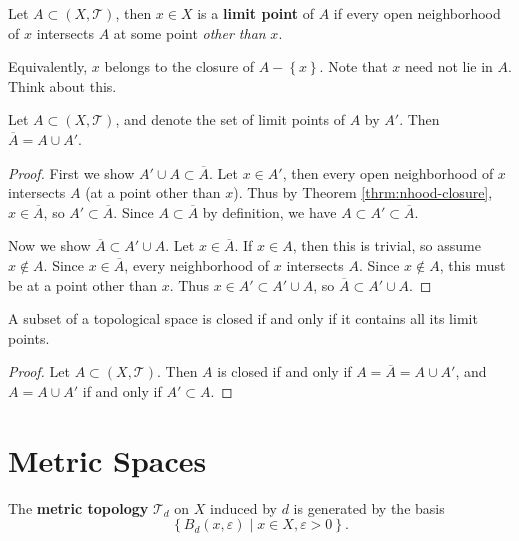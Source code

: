 \documentclass[10pt]{report}
\begin{document}
\begin{defn}
Let $A \subset (X,\mathcal{T})$, then $x \in X$ is a \textbf{limit point} of $A$ if every open neighborhood of $x$ intersects $A$ at some point \textit{other than} $x$.

	Equivalently, $x$ belongs to the closure of $A - \left\{ x \right\}$. Note that $x$ need not lie in $A$. {\color{red}Think about this.}
\end{defn}

\begin{thrm}
	Let $A \subset (X,\mathcal{T})$, and denote the set of limit points of $A$ by $A'$. Then $\overline{A}=A \cup A'$.
\end{thrm}
\begin{proof}
	First we show $A' \cup A \subset \overline{A} $. Let $x \in A'$, then every open neighborhood of $x$ intersects $A$ (at a point other than $x$). Thus by Theorem \ref{thrm:nhood-closure}, $x \in \overline{A}$, so $A' \subset  \overline{A}$. Since $A \subset \overline{A}$ by definition, we have $A \subset A' \subset \overline{A}$.

	Now we show $\overline{A} \subset A' \cup A$. Let $x \in \overline{A}$. If $x \in A$, then this is trivial, so assume $x \not\in A$. Since $x \in \overline{A}$, every neighborhood of $x$ intersects $A$. Since $x \not\in A$, this must be at a point other than $x$. Thus $x \in A'\subset A' \cup A$, so $\overline{A} \subset A' \cup A$.
\end{proof}

\begin{cor}
	A subset of a topological space is closed if and only if it contains all its limit points.
\end{cor}
\begin{proof}
	Let $A \subset (X, \mathcal{T})$. Then $A$ is closed if and only if $A = \overline{A} = A \cup A'$, and $A = A \cup A'$ if and only if $A' \subset A$.
\end{proof}


\section{Metric Spaces}

\begin{defn}[]
The \textbf{metric topology} $\mathcal{T}_{d}$ on $X$ induced by $d$ is generated by the basis
\[
	\left\{ B_{d}(x,\varepsilon) \;|\; x \in X, \varepsilon>0 \right\}.
\] 
\end{defn}
\end{document}
